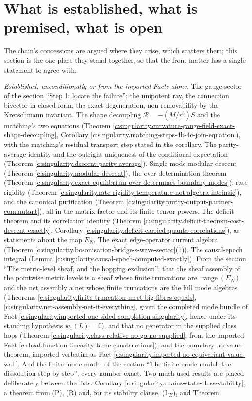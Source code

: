 \documentclass[11pt]{article}
\theoremstyle{definition}
\theoremstyle{plain}
\providecommand{\EN}{}\renewcommand{\EN}{E_{N}}
\providecommand{\shL}{}\renewcommand{\shL}{L}
\begin{document}
\section{What is established, what is premised, what is open}

\label{c:note.singularity.setting-what-established-what-premised-what}
The chain's concessions are argued where they arise, which scatters them; this section is the one place they stand together, so that the front matter has a single statement to agree with.

\emph{Established, unconditionally or from the imported Facts alone.} The gauge sector of the section ``Step 1: locate the failure'': the unipotent ray, the connection bivector in closed form, the exact degeneration, non-removability by the Kretschmann invariant. The shape decoupling $\mathcal{R} = -(M/r^{3})S$ and the matching's two equations (Theorem \ref{c:singularity.curvature-gauge-field-exact-shape-decoupling}, Corollary \ref{c:singularity.matching-steps-4b-4c-join-equation}), with the matching's residual transport step stated in the corollary. The parity-average identity and the outright uniqueness of the conditional expectation (Theorem \ref{c:singularity.descent-parity-average}). Single-mode modular descent (Theorem \ref{c:singularity.modular-descent}), the over-determination theorem (Theorem \ref{c:singularity.exact-equilibrium-over-determines-boundary-modes}), rate rigidity (Theorem \ref{c:singularity.rate-rigidity-temperature-not-algebra-intrinsic}), and the canonical purification (Theorem \ref{c:singularity.purity-output-partner-commutant}), all in the matrix factor and its finite tensor powers. The deficit theorem and its correlation identity (Theorem \ref{c:singularity.deficit-theorem-cost-descent-exactly}, Corollary \ref{c:singularity.deficit-carried-quanta-correlations}), as statements about the map $\EN$. The exact edge-operator current algebra (Theorem \ref{c:singularity.bosonisation-bridge-s-wave-sector}(1)). The causal-epoch integral (Lemma \ref{c:singularity.causal-epoch-computed-exactly}). From the section ``The metric-level sheaf, and the hopping exclusion'': that the sheaf assembly of the pointwise metric levels is a sheaf whose finite truncations are $\operatorname{range}(\EN)$ and the net assembly a net whose finite truncations are the full mode algebras (Theorems \ref{c:singularity.finite-truncation-meet-big-fibres-equals}, \ref{c:singularity.net-assembly-net-it-everything}, given the completed mode bundle of Fact \ref{c:singularity.imported-one-sided-completion-singularity}, hence under its standing hypothesis $w_1(\shL) = 0$), and that no generator in the supplied class hops (Theorem \ref{c:singularity.class-relative-no-go-no-supplied}, from the imported Fact \ref{c:sheaf.function-linearity-tame-constructions}); and the boundary no-value theorem, imported verbatim as Fact \ref{c:singularity.imported-no-equivariant-value-wall}. And the finite-mode model of the section ``The finite-mode model: the dissolution step by step'', every number exact. Two much-used results are placed deliberately between the lists: Corollary \ref{c:singularity.chains-state-class-stability}, a theorem from (P), (R) and, for its stability clause, (L$_E$), and Theorem 
\end{document}
